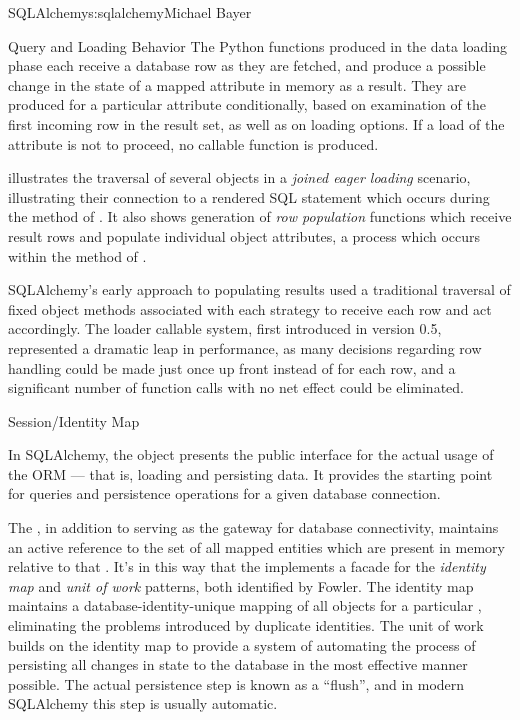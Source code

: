\begin{aosachapter}{SQLAlchemy}{s:sqlalchemy}{Michael Bayer}
\begin{aosasect1}{Query and Loading Behavior}
The Python functions produced in the data loading phase each receive a database row
as they are fetched, and produce a possible change in the state of
a mapped attribute in memory as a result.   They are produced for a particular attribute
conditionally, based on examination of the first incoming row in the result set, as well as
on loading options.   If a load of the attribute is not to proceed, no callable function is produced.

 illustrates the traversal of several  objects in a \emph{joined eager loading}
scenario, illustrating their connection to a rendered SQL statement which occurs during the 
method of .  It also shows generation of \emph{row population} functions which receive result rows
and populate individual object attributes, a process which occurs within the  method of .


SQLAlchemy's early approach to populating results used a traditional traversal
of fixed object methods associated with each strategy to receive each row and
act accordingly. The loader callable system, first introduced in version 0.5,
represented a dramatic leap in performance, as many decisions regarding row
handling could be made just once up front instead of for each row, and a
significant number of function calls with no net effect could be eliminated.

\end{aosasect1}

\begin{aosasect1}{Session/Identity Map}

In SQLAlchemy,
the  object presents the public interface for the actual usage of
the ORM --- that is, loading and persisting data.  It provides the starting
point for queries and persistence operations for a given database connection.

The , in addition to serving as the gateway for database connectivity,
maintains an active reference to the set of all mapped entities which are present
in memory relative to that .  It's in this way that the 
implements a facade for the \emph{identity map} and \emph{unit of work} patterns, both
identified by Fowler.   The identity map maintains a database-identity-unique
mapping of all objects for a particular , eliminating the problems
introduced by duplicate identities.  The unit of work builds on the identity map
to provide a system of automating the process of persisting all changes in state to the
database in the most effective manner possible.   The actual persistence step
is known as a ``flush'', and in modern SQLAlchemy this step is usually automatic.


\end{aosasect1}
\end{aosachapter}
